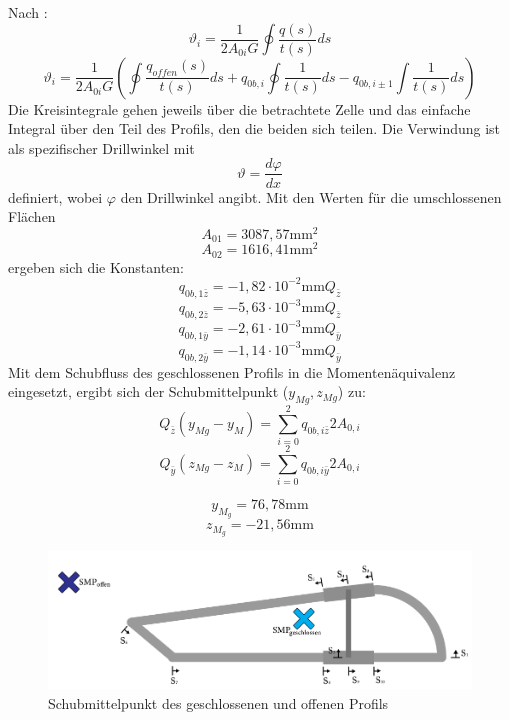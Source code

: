 Nach \cite{item15}:
\begin{equation}
	\vartheta_{i} = \frac{1}{2A_{0i}G}\oint\frac{q(s)}{t(s)}ds
\end{equation}
\begin{equation}\label{dickeFormel}
	\vartheta_{i} = \frac{1}{2A_{0i}G}(\oint\frac{q_{offen}(s)}{t(s)}ds+q_{0b,i}\oint\frac{1}{t(s)}ds-q_{0b,i\pm1}\int\frac{1}{t(s)}ds)
\end{equation}
Die Kreisintegrale gehen jeweils über die betrachtete Zelle und das einfache Integral über den Teil des Profils, den die beiden sich teilen.
Die Verwindung ist als spezifischer Drillwinkel mit
\begin{equation}
	\vartheta = \frac{d\varphi}{dx}
\end{equation}
definiert, wobei $\varphi$ den Drillwinkel angibt.
Mit den Werten für die umschlossenen Flächen
$$
	A_{01}=3087,57\mathrm{mm}^2
$$
$$
	A_{02}=1616,41\mathrm{mm}^2
$$
ergeben sich die Konstanten:
$$
	q_{0b,1\bar{z}}=-1,82\cdot10^{-2}\mathrm{mm}Q_{\bar{z}}
$$$$
	q_{0b,2\bar{z}}=-5,63\cdot10^{-3}\mathrm{mm}Q_{\bar{z}}
$$$$
	q_{0b,1\bar{y}}=-2,61\cdot10^{-3}\mathrm{mm}Q_{\bar{y}}
$$$$
	q_{0b,2\bar{y}}=-1,14\cdot10^{-3}\mathrm{mm}Q_{\bar{y}}
$$
Mit dem Schubfluss des geschlossenen Profils in die Momentenäquivalenz eingesetzt, ergibt sich der Schubmittelpunkt ($y_{Mg}, z_{Mg}$) zu:
\begin{equation}
	Q_{\bar{z}}(y_{Mg}-y_{M})=\sum_{i=0}^{2}q_{0b,i\bar{z}}2A_{0,i}
\end{equation}
\begin{equation}
Q_{\bar{y}}(z_{Mg}-z_{M})=\sum_{i=0}^{2}q_{0b,i\bar{y}}2A_{0,i}
\end{equation}

$$
	y_{M_{g}}=76,78\mathrm{mm}
$$
$$
	z_{M_{g}}=-21,56\mathrm{mm}
$$
\begin{figure}[h]
	\centering
	\includegraphics[width=1\textwidth]{Bilder/SMP}
	\caption{Schubmittelpunkt des geschlossenen und offenen Profils}
\end{figure}
